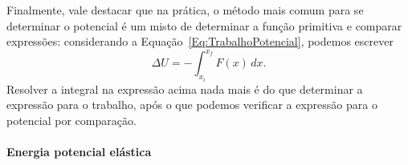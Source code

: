 Finalmente, vale destacar que na prática, o método mais comum para se determinar o potencial é um misto de determinar a função primitiva e comparar expressões: considerando a Equação~\eqref{Eq:TrabalhoPotencial}, podemos escrever
\begin{equation}\label{Eq:CalculoDoPotencial}
    \Delta U = - \int_{x_i}^{x_f} F(x) \,dx.
\end{equation}
%
Resolver a integral na expressão acima nada mais é do que determinar a expressão para o trabalho, após o que podemos verificar a expressão para o potencial por comparação.


\paragraph{Energia potencial elástica}

